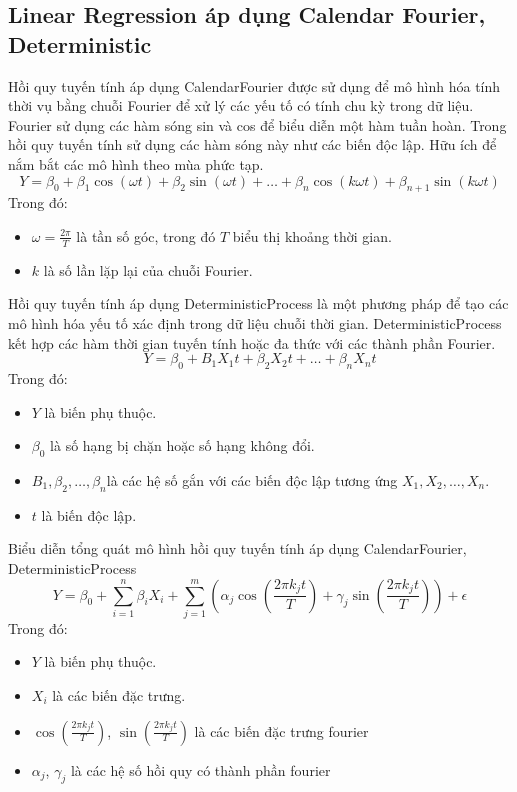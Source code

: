 \documentclass[conference]{IEEEtran}
\begin{document}
\subsection{Linear Regression áp dụng Calendar Fourier, Deterministic}
Hồi quy tuyến tính áp dụng CalendarFourier được sử dụng để mô hình hóa tính thời vụ bằng chuỗi Fourier để xử lý các yếu tố có tính chu kỳ trong dữ liệu. Fourier sử dụng các hàm sóng sin và cos để biểu diễn một hàm tuần hoàn. Trong hồi quy tuyến tính sử dụng các hàm sóng này như các biến độc lập. Hữu ích để nắm bắt các mô hình theo mùa phức tạp.
\[Y = \beta_0 + \beta_1 \cos(\omega t) + \beta_2 \sin(\omega t) + \ldots + \beta_n \cos(k \omega t) + \beta_{n+1} \sin(k \omega t)\]
Trong đó:
\begin{itemize}
    \item \(\omega = \frac{2\pi}{T}\) là tần số góc, trong đó \(T\) biểu thị khoảng thời gian.
    \item \(k\) là số lần lặp lại của chuỗi Fourier.
\end{itemize}

Hồi quy tuyến tính áp dụng DeterministicProcess là một phương pháp để tạo các mô hình hóa yếu tố xác định trong dữ liệu chuỗi thời gian. DeterministicProcess kết hợp các hàm thời gian tuyến tính hoặc đa thức với các thành phần Fourier. \cite{LRDeterministicProcess}
\[Y = \beta_0 + B_1 X_1 t + \beta_2 X_2 t + \ldots + \beta_n X_n t\]
Trong đó:
\begin{itemize}
    \item \(Y\) là biến phụ thuộc.
    \item \(\beta_0\) là số hạng bị chặn hoặc số hạng không đổi.
    \item \(B_1, \beta_2, \ldots, \beta_n\)là các hệ số gắn với các biến độc lập tương ứng \(X_1, X_2, \ldots, X_n\).
    \item \(t\) là biến độc lập.
\end{itemize}

Biểu diễn tổng quát mô hình hồi quy tuyến tính áp dụng CalendarFourier, DeterministicProcess
\[
Y = \beta_0 + \sum_{i=1}^{n} \beta_i X_i + \sum_{j=1}^{m} \left( \alpha_j \cos\left(\frac{2 \pi k_j t}{T}\right) + \gamma_j \sin\left(\frac{2 \pi k_j t}{T}\right) \right) + \epsilon
\]
Trong đó:
\begin{itemize}
    \item \(Y\) là biến phụ thuộc.
    \item \(X_i\) là các biến đặc trưng.
    \item \(\cos\left(\frac{2 \pi k_j t}{T}\right)\), \(\sin\left(\frac{2 \pi k_j t}{T}\right)\) là các biến đặc trưng fourier
    \item \(\alpha_j\), \(\gamma_j\) là các hệ số hồi quy có thành phần fourier
\end{itemize}
\end{document}
